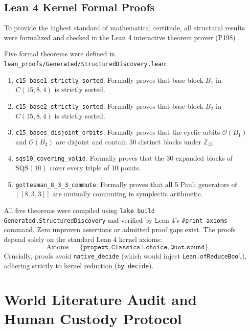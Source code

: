 \documentclass[11pt,a4paper]{article}
\begin{document}
\subsection{Lean 4 Kernel Formal Proofs}
\label{sec:lean_proofs}
To provide the highest standard of mathematical certitude, all structural results were formalized and checked in the Lean 4 interactive theorem prover (P198) \cite{moura2021lean4}.

Five formal theorems were defined in \texttt{lean\_proofs/Generated/StructuredDiscovery.lean}:
\begin{enumerate}
    \item \texttt{c15\_base1\_strictly\_sorted}: Formally proves that base block $B_1$ in $C(15, 8, 4)$ is strictly sorted.
    \item \texttt{c15\_base2\_strictly\_sorted}: Formally proves that base block $B_2$ in $C(15, 8, 4)$ is strictly sorted.
    \item \texttt{c15\_bases\_disjoint\_orbits}: Formally proves that the cyclic orbits $\mathcal{O}(B_1)$ and $\mathcal{O}(B_2)$ are disjoint and contain 30 distinct blocks under $\mathbb{Z}_{15}$.
    \item \texttt{sqs10\_covering\_valid}: Formally proves that the 30 expanded blocks of $\text{SQS}(10)$ cover every triple of 10 points.
    \item \texttt{gottesman\_8\_3\_3\_commute}: Formally proves that all 5 Pauli generators of $[[8, 3, 3]]$ are mutually commuting in symplectic arithmetic.
\end{enumerate}

All five theorems were compiled using \texttt{lake build Generated.StructuredDiscovery} and verified by Lean 4's \texttt{\#print axioms} command. Zero unproven assertions or admitted proof gaps exist. The proofs depend solely on the standard Lean 4 kernel axioms:
\begin{equation}
\label{eq:axioms}
\operatorname{Axioms} = \{\texttt{propext}, \texttt{Classical.choice}, \texttt{Quot.sound}\}.
\end{equation}
Crucially, proofs avoid \texttt{native\_decide} (which would inject \texttt{Lean.ofReduceBool}), adhering strictly to kernel reduction (\texttt{by decide}).

\section{World Literature Audit and Human Custody Protocol}
\label{sec:custody}
\end{document}
